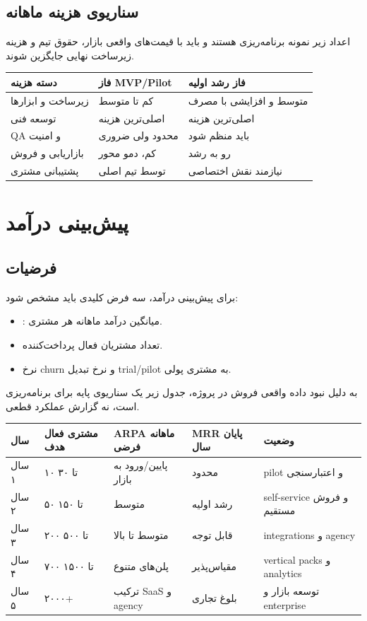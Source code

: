 \documentclass[12pt,a4paper]{article}
\newcommand{\en}[1]{\lr{#1}}
\begin{document}
\subsection{سناریوی هزینه ماهانه}
اعداد زیر نمونه برنامه‌ریزی هستند و باید با قیمت‌های واقعی بازار، حقوق تیم و هزینه زیرساخت نهایی جایگزین شوند.

\begin{longtable}{R{52mm} R{36mm} R{58mm}}
\toprule
\textbf{دسته هزینه} & \textbf{فاز MVP/Pilot} & \textbf{فاز رشد اولیه} \\
\midrule
\endhead
زیرساخت و ابزارها & کم تا متوسط & متوسط و افزایشی با مصرف \\
توسعه فنی & اصلی‌ترین هزینه & اصلی‌ترین هزینه \\
QA و امنیت & محدود ولی ضروری & باید منظم شود \\
بازاریابی و فروش & کم، دمو محور & رو به رشد \\
پشتیبانی مشتری & توسط تیم اصلی & نیازمند نقش اختصاصی \\
\bottomrule
\end{longtable}

\section{پیش‌بینی درآمد}
\subsection{فرضیات}
برای پیش‌بینی درآمد، سه فرض کلیدی باید مشخص شود:
\begin{itemize}
  \item \en{ARPA}: میانگین درآمد ماهانه هر مشتری.
  \item تعداد مشتریان فعال پرداخت‌کننده.
  \item نرخ churn و نرخ تبدیل trial/pilot به مشتری پولی.
\end{itemize}

به دلیل نبود داده واقعی فروش در پروژه، جدول زیر یک سناریوی پایه برای برنامه‌ریزی است، نه گزارش عملکرد قطعی.

\begin{longtable}{R{28mm} R{32mm} R{32mm} R{38mm} R{32mm}}
\toprule
\textbf{سال} & \textbf{مشتری فعال هدف} & \textbf{ARPA ماهانه فرضی} & \textbf{MRR پایان سال} & \textbf{وضعیت} \\
\midrule
\endhead
سال ۱ & ۱۰ تا ۳۰ & پایین/ورود به بازار & محدود & pilot و اعتبارسنجی \\
سال ۲ & ۵۰ تا ۱۵۰ & متوسط & رشد اولیه & self-service و فروش مستقیم \\
سال ۳ & ۲۰۰ تا ۵۰۰ & متوسط تا بالا & قابل توجه & integrations و agency \\
سال ۴ & ۷۰۰ تا ۱۵۰۰ & پلن‌های متنوع & مقیاس‌پذیر & vertical packs و analytics \\
سال ۵ & ۲۰۰۰+ & ترکیب SaaS و agency & بلوغ تجاری & توسعه بازار و enterprise \\
\bottomrule
\end{longtable}
\end{document}
